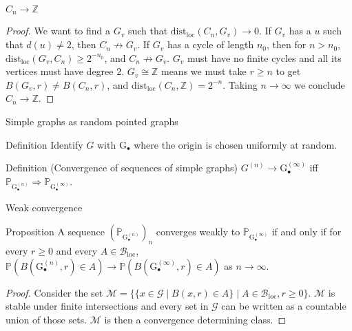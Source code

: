 \documentclass{beamer}
\newcommand{\G}{\mathrm{G}}
\newcommand{\Prob}{\mathbb{P}}
\newcommand{\dloc}{\mathrm{dist}_\mathrm{loc}}
\newcommand{\Gcal}{\mathcal{G}}
\newcommand{\Z}{\mathbb{Z}}
\newcommand{\Borelian}{\mathcal{B}_\mathrm{loc}}
\newcommand{\M}{\mathcal{M}}
\begin{document}
\begin{frame}{$C_n \to \Z$}
  \begin{proof}
    We want to find a $G_v$ such that $\dloc(C_n, G_v) \to 0$.
    \pause
    If $G_v$ has a $u$ such that $d(u) \ne 2$, then $C_n \not \to G_v$.
    \pause
    If $G_v$ has a cycle of length $n_0$, then for $n > n_0$, $\dloc(G_v, C_n) \ge
      2^{-n_0}$, and $C_n \not \to G_v$.
    \pause
    $G_v$ must have no finite cycles and all its vertices must have degree $2$.
    \pause
    $G_v \cong \Z$ means we must take $r \ge n$ to get $B(G_v, r) \neq B(C_n, r)$, and
    $\dloc(C_n, \Z) = 2^{-n}$.
    \pause
    Taking $n \to \infty$ we conclude $C_n \to \Z$.
  \end{proof}
\end{frame}

\begin{frame}{Simple graphs as random pointed graphs}
  \pause
  \begin{block}{Definition}
    Identify $G$ with $\G_\bullet$ where the origin is chosen uniformly at random.
  \end{block}

  \pause

  \begin{block}{Definition (Convergence of sequences of simple graphs)}
    $G^{(n)} \to \G^{(\infty)}_\bullet$ iff $\Prob_{\G_\bullet^{(n)}} \Rightarrow
      \Prob_{\G^{(\infty)}_\bullet}$.
  \end{block}

\end{frame}

\begin{frame}{Weak convergence}
  \begin{block}{Proposition}
    A sequence $(\Prob_{\G_\bullet^{(n)}})_n$ converges weakly to
    $\Prob_{\G_\bullet^{(\infty)}}$ if and only if for every $r \ge 0$ and every $A \in
      \mathcal{B}_\mathrm{loc}$, $\Prob(B(\G_\bullet^{(n)}, r) \in A) \to
      \Prob(B(\G_\bullet^{(\infty)}, r) \in A)$ as $n \to \infty$.
  \end{block}
  \pause
  \begin{proof}
    Consider the set $\M = \{\{x \in \Gcal \mid B(x, r) \in A\} \mid A \in \Borelian, r \ge
      0\}$.
    \pause
    $\M$ is stable under finite intersections and every set in $\Gcal$ can be written
    as a countable union of those sets.
    \pause
    $\M$ is then a convergence determining class.
  \end{proof}
\end{frame}
\end{document}
